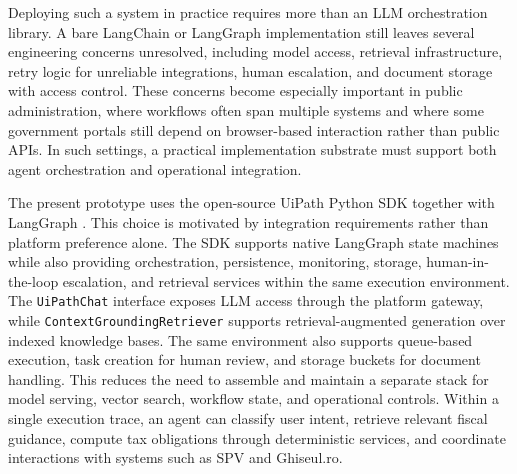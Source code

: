 \documentclass[3p,times,procedia]{elsarticle}
\begin{document}
Deploying such a system in practice requires more than an LLM orchestration library. A bare LangChain or LangGraph implementation still leaves several engineering concerns unresolved, including model access, retrieval infrastructure, retry logic for unreliable integrations, human escalation, and document storage with access control. These concerns become especially important in public administration, where workflows often span multiple systems and where some government portals still depend on browser-based interaction rather than public APIs. In such settings, a practical implementation substrate must support both agent orchestration and operational integration.

The present prototype uses the open-source UiPath Python SDK \cite{UiPathSDK2025} together with LangGraph \cite{LangGraph2025}. This choice is motivated by integration requirements rather than platform preference alone. The SDK supports native LangGraph state machines while also providing orchestration, persistence, monitoring, storage, human-in-the-loop escalation, and retrieval services within the same execution environment. The \texttt{UiPathChat} interface exposes LLM access through the platform gateway, while \texttt{ContextGroundingRetriever} supports retrieval-augmented generation over indexed knowledge bases. The same environment also supports queue-based execution, task creation for human review, and storage buckets for document handling. This reduces the need to assemble and maintain a separate stack for model serving, vector search, workflow state, and operational controls. Within a single execution trace, an agent can classify user intent, retrieve relevant fiscal guidance, compute tax obligations through deterministic services, and coordinate interactions with systems such as SPV and Ghiseul.ro.
\end{document}
